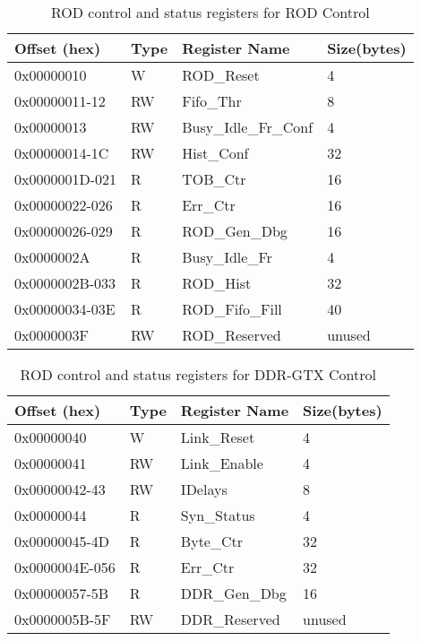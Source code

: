 \begin {table}[H]
\begin{center}
\caption {ROD control and status registers for ROD Control}
\label{rod_control_rod}
\begin{tabular}{|l|l|l|l|}
\hline
Offset (hex)& Type & Register Name & Size(bytes)\\
\hline
0x00000010 & W & ROD\_Reset & 4 \\
\hline
0x00000011-12 & RW & Fifo\_Thr & 8 \\
\hline
0x00000013 & RW & Busy\_Idle\_Fr\_Conf & 4 \\
\hline
0x00000014-1C & RW & Hist\_Conf & 32 \\
\hline
0x0000001D-021 & R & TOB\_Ctr & 16 \\
\hline
0x00000022-026 & R & Err\_Ctr & 16 \\
\hline
0x00000026-029 & R & ROD\_Gen\_Dbg & 16 \\
\hline
0x0000002A & R & Busy\_Idle\_Fr & 4 \\
\hline
0x0000002B-033 & R & ROD\_Hist & 32 \\
\hline
0x00000034-03E & R & ROD\_Fifo\_Fill & 40 \\
\hline
0x0000003F & RW & ROD\_Reserved & unused \\
\hline
\end{tabular}
\end{center}
\end{table}


\begin {table}[H]
\begin{center}
\caption {ROD control and status registers for DDR-GTX Control}
\label{rod_control_ddrgtx}
\begin{tabular}{|l|l|l|l|}
\hline
Offset (hex)& Type & Register Name & Size(bytes)\\
\hline
0x00000040 & W & Link\_Reset & 4 \\
\hline
0x00000041 & RW & Link\_Enable & 4 \\
\hline
0x00000042-43 & RW & IDelays & 8 \\
\hline
0x00000044 & R & Syn\_Status & 4 \\
\hline
0x00000045-4D & R & Byte\_Ctr & 32 \\
\hline
0x0000004E-056 & R & Err\_Ctr & 32 \\
\hline
0x00000057-5B & R & DDR\_Gen\_Dbg & 16 \\
\hline
0x0000005B-5F & RW & DDR\_Reserved & unused \\
\hline
\end{tabular}
\end{center}
\end{table}


